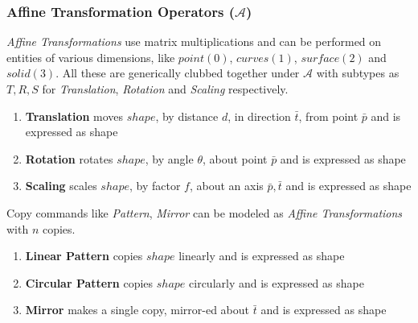 
\subsubsection{Affine Transformation Operators ($\mathcal{A}$)}

{\em Affine Transformations} use matrix multiplications and can be performed on entities of various dimensions, like $point (0)$, $curves(1)$, $surface(2)$ and $solid(3)$. All these are generically clubbed together under {\bf $\mathcal{A}$} with subtypes as $T,R,S$ for {\em Translation}, {\em Rotation} and {\em Scaling} respectively.


\begin{enumerate}
\item {\bf Translation} moves $shape$, by distance $d$, in direction $\bar{t}$, from point $\bar{p}$ and is expressed as 	 {shape}
\item{\bf Rotation} rotates $shape$, by angle $\theta$, about point $\bar{p}$ and is expressed as 	 {shape}	
\item {\bf Scaling} scales $shape$, by factor  $f$, about an axis $\bar{p},\bar{t}$ and is expressed as 	 {shape}		
\end{enumerate}

Copy commands like {\em Pattern}, {\em Mirror} can be modeled as {\em Affine Transformations} with $n$ copies.

\begin{enumerate}
\item {\bf Linear Pattern} copies $shape$ linearly and is expressed as  {shape} 
\item {\bf Circular Pattern} copies $shape$ circularly and is expressed as  {shape} 
\item {\bf Mirror} makes a single copy, mirror-ed about $\bar{t}$ and is expressed as  {shape}	
\end{enumerate}

